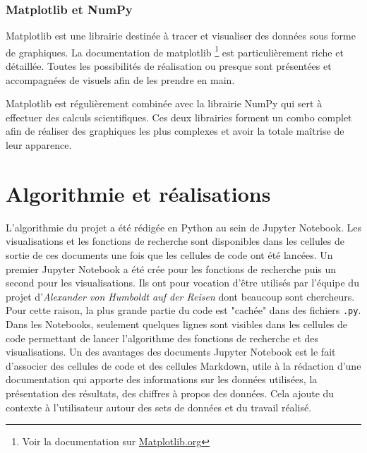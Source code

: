 \documentclass[a4paper, 12pt, twoside]{book}
\begin{document}
\subsubsection{Matplotlib et NumPy}
Matplotlib est une librairie destinée à tracer et visualiser des données sous forme de graphiques. La documentation de matplotlib \footnote{Voir la documentation sur \href{https://matplotlib.org/stable/contents.html}{Matplotlib.org}} est particulièrement riche et détaillée. Toutes les possibilités de réalisation ou presque sont présentées et accompagnées de visuels afin de les prendre en main. 

Matplotlib est régulièrement combinée avec la librairie NumPy qui sert à effectuer des calculs scientifiques. Ces deux librairies forment un combo complet afin de réaliser des graphiques les plus complexes et avoir la totale maîtrise de leur apparence. 

\section{Algorithmie et réalisations}
L'algorithmie du projet a été rédigée en Python au sein de Jupyter Notebook. Les visualisations et les fonctions de recherche sont disponibles dans les cellules de sortie de ces documents une fois que les cellules de code ont été lancées. Un premier Jupyter Notebook a été crée pour les fonctions de recherche puis un second pour les visualisations. Ils ont pour vocation d'être utilisés par l'équipe du projet d'\textit{Alexander von Humboldt auf der Reisen} dont beaucoup sont chercheurs. Pour cette raison, la plus grande partie du code est "cachée" dans des fichiers \texttt{.py}. Dans les Notebooks, seulement quelques lignes sont visibles dans les cellules de code permettant de lancer l'algorithme des fonctions de recherche et des visualisations. Un des avantages des documents Jupyter Notebook est le fait d'associer des cellules de code et des cellules Markdown, utile à la rédaction d'une documentation qui apporte des informations sur les données utilisées, la présentation des résultats, des chiffres à propos des données. Cela ajoute du contexte à l'utilisateur autour des sets de données et du travail réalisé.
\end{document}
